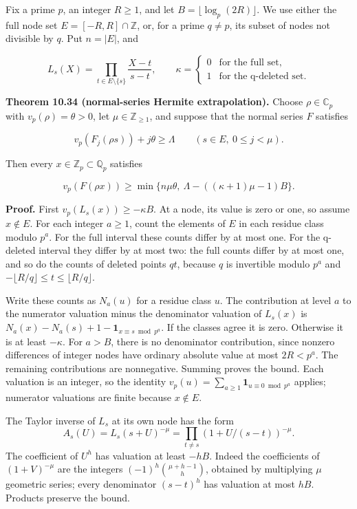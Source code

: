 \documentclass[
  11pt,
  a4paper,
]{article}
\begin{document}
Fix a prime \(p\), an integer \(R\ge1\), and let
\(B=\lfloor\log_p(2R)\rfloor\). We use either the full node set
\(E=[-R,R]\cap\mathbb Z\), or, for a prime \(q\ne p\), its subset of
nodes not divisible by \(q\). Put \(n=|E|\), and

\[
L_s(X)=\prod_{t\in E\setminus\{s\}}\frac{X-t}{s-t},\qquad
\kappa=\begin{cases}0&\text{for the full set},\\1&\text{for the q-deleted set}.\end{cases}
\tag{10.99}
\]

\textbf{Theorem 10.34 (normal-series Hermite extrapolation).} Choose
\(\rho\in\mathbb C_p\) with \(v_p(\rho)=\theta>0\), let
\(\mu\in\mathbb Z_{\ge1}\), and suppose that the normal series \(F\)
satisfies

\[
v_p(F_j(\rho s))+j\theta\ge\Lambda
\qquad(s\in E,\ 0\le j<\mu).
\tag{10.100}
\]

Then every \(x\in\mathbb Z_p\subset\mathbb Q_p\) satisfies

\[
v_p(F(\rho x))\ge
\min\{n\mu\theta,\ \Lambda-((\kappa+1)\mu-1)B\}.
\tag{10.101}
\]

\textbf{Proof.} First \(v_p(L_s(x))\ge-\kappa B\). At a node, its value
is zero or one, so assume \(x\notin E\). For each integer \(a\ge1\),
count the elements of \(E\) in each residue class modulo \(p^a\). For
the full interval these counts differ by at most one. For the q-deleted
interval they differ by at most two: the full counts differ by at most
one, and so do the counts of deleted points \(qt\), because \(q\) is
invertible modulo \(p^a\) and
\(-\lfloor R/q\rfloor\le t\le\lfloor R/q\rfloor\).

Write these counts as \(N_a(u)\) for a residue class \(u\). The
contribution at level \(a\) to the numerator valuation minus the
denominator valuation of \(L_s(x)\) is
\(N_a(x)-N_a(s)+1-\mathbf1_{x\equiv s\bmod p^a}\). If the classes agree
it is zero. Otherwise it is at least \(-\kappa\). For \(a>B\), there is
no denominator contribution, since nonzero differences of integer nodes
have ordinary absolute value at most \(2R<p^a\). The remaining
contributions are nonnegative. Summing proves the bound. Each valuation
is an integer, so the identity
\(v_p(u)=\sum_{a\ge1}\mathbf1_{u\equiv0\bmod p^a}\) applies; numerator
valuations are finite because \(x\notin E\).

The Taylor inverse of \(L_s\) at its own node has the form \[
A_s(U)=L_s(s+U)^{-\mu}
=\prod_{t\ne s}(1+U/(s-t))^{-\mu}.
\] The coefficient of \(U^h\) has valuation at least \(-hB\). Indeed the
coefficients of \((1+V)^{-\mu}\) are the integers
\((-1)^h\binom{\mu+h-1}{h}\), obtained by multiplying \(\mu\) geometric
series; every denominator \((s-t)^h\) has valuation at most \(hB\).
Products preserve the bound.
\end{document}
